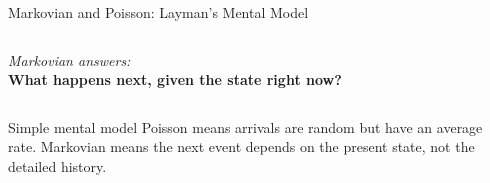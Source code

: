 \documentclass[aspectratio=169]{beamer}
\begin{document}
\begin{frame}{Markovian and Poisson: Layman's Mental Model}
\begin{columns}[T]
\vspace{0.1cm}

\begin{center}
\textit{Markovian answers:}\\
\textbf{What happens next, given the state right now?}
\end{center}

\end{columns}

\vspace{0.2cm}

\begin{alertblock}{Simple mental model}
Poisson means arrivals are random but have an average rate.  
Markovian means the next event depends on the present state, not the detailed history.
\end{alertblock}

\end{frame}
\end{document}
